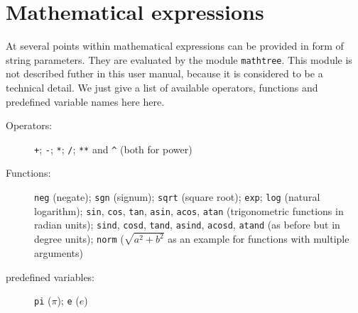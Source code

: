 \chapter{Mathematical expressions}
\label{mathtree}

At several points within \PyX{} mathematical expressions can be
provided in form of string parameters. They are evaluated by the
module \verb|mathtree|. This module is not described futher in this
user manual, because it is considered to be a technical detail. We
just give a list of available operators, functions and predefined
variable names here here.

\begin{description}
\item[Operators:]
\verb|+|; \verb|-|; \verb|*|; \verb|/|; \verb|**| and \verb|^| (both
for power)
\item[Functions:]
\verb|neg| (negate); \verb|sgn| (signum); \verb|sqrt| (square root);
\verb|exp|; \verb|log| (natural logarithm); \verb|sin|, \verb|cos|,
\verb|tan|, \verb|asin|, \verb|acos|, \verb|atan| (trigonometric
functions in radian units); \verb|sind|, \verb|cosd|, \verb|tand|,
\verb|asind|, \verb|acosd|, \verb|atand| (as before but in degree
units); \verb|norm| ($\sqrt{a^2+b^2}$ as an example for functions with
multiple arguments)
\item[predefined variables:]
\verb|pi| ($\pi$); \verb|e| ($e$)
\end{description}
